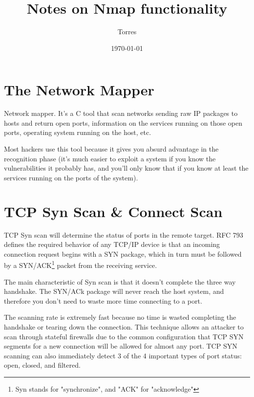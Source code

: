 \documentclass{article}
\title{Notes on Nmap functionality}
\author{Torres}
\date{\today}
\begin{document}
\maketitle
\section{The Network Mapper}

Network mapper. It's a C tool that scan networks sending
raw IP packages to hosts and return open ports, information
on the services running on those open ports, operating
system running on the host, etc.

Most hackers use this tool because it gives you absurd
advantage in the recognition phase (it's much easier to
exploit a system if you know the vulnerabilities it probably
has, and you'll only know that if you know at least the
services running on the ports of the system).

\section{TCP Syn Scan \& Connect Scan}

TCP Syn scan will determine the status of ports in the remote
target. RFC 793 defines the required behavior of any TCP/IP device
is that an incoming connection request begins with a SYN package,
which in turn must be followed by a SYN/ACK\footnote{Syn stands
for "synchronize", and "ACK" for "acknowledge"} packet from
the receiving service.

The main characteristic of Syn scan is that it doesn't complete
the three way handshake. The SYN/ACk package will never reach the
host system, and therefore you don't need to waste more time
connecting to a port.

The scanning rate is extremely fast because no time is wasted
completing the handshake or tearing down the connection. This
technique allows an attacker to scan through stateful firewalls
due to the common configuration that TCP SYN segments for a new
connection will be allowed for almost any port. TCP SYN scanning
can also immediately detect 3 of the 4 important types of port
status: open, closed, and filtered.
\end{document}
